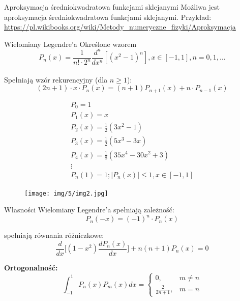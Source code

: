 \begin{frame}{Aproksymacja średniokwadratowa funkcjami sklejanymi}
	Możliwa jest aproksymacja średniokwadratowa funkcjami sklejanymi.\newline
    \newline
    Przykład: \url{https://pl.wikibooks.org/wiki/Metody_numeryczne_fizyki/Aproksymacja}
\end{frame}
\begin{frame}{Wielomiany Legendre'a}
	Określone wzorem $$P_n(x) = \frac{1}{n! \cdot 2^n}\frac{d^n}{dx^n}[(x^{2}-1)^n], x \in [-1,1], n = 0,1,\ldots$$\\
    Spełniają wzór rekurencyjny (dla $n\geqslant1$):
    $$(2n+1) \cdot x \cdot P_n(x)=(n+1)P_{n+1}(x)+n \cdot P_{n-1}(x)$$
    \begin{flushleft}
    	$$\left.\begin{array}{l}
    P_0 = 1 \\
    P_1(x) = x \\
    P_2(x) = \frac{1}{2}(3x^2-1)\\
    P_3(x) = \frac{1}{2}(5x^3-3x) \\
    P_4(x) = \frac{1}{8}(35x^4-30x^2+3)\\
    \vdots \\
    P_n(1) = 1; |P_n(x)| \leqslant 1, x \in [-1,1]
    \end{array}\right.$$
    \end{flushleft}
\end{frame}
\begin{frame}
	\begin{figure}
		\texttt{[image: img/5/img2.jpg]}
	\end{figure}
\end{frame}
\begin{frame}{Własności}
	Wielomiany Legendre'a spełniają zależność:
	$$P_n(-x) = (-1)^n \cdot P_n(x)$$ 
  
	spełniają równania różniczkowe:
        $$\frac{d}{dx}\bigg[(1-x^2)\frac{dP_n(x)}{dx}\bigg]+n(n+1)P_n(x) = 0$$
        
        \textbf{Ortogonalność: }
        $$\int_{-1}^{1}P_n(x)P_m(x)dx = \left\{\begin{array}{cc}
        0, & m \not= n \\
        \frac{2}{2n+1}, & m = n 
        \end{array}\right.$$
\end{frame}

